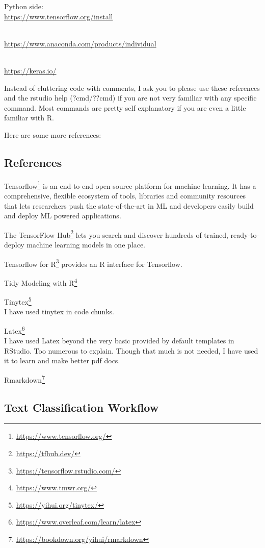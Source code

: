 \documentclass[
]{article}
\DeclareRobustCommand{\href}[2]{#2\footnote{\url{#1}}}
\begin{document}
Python side:\\
\url{https://www.tensorflow.org/install}\strut \\
\url{https://www.anaconda.com/products/individual}\strut \\
\url{https://keras.io/}

Instead of cluttering code with comments, I ask you to please use these
references and the rstudio help (?cmd/??cmd) if you are not very
familiar with any specific command. Most commands are pretty self
explanatory if you are even a little familiar with R.

Here are some more references:

\hypertarget{references}{%
\subsection{References}\label{references}}

\href{https://www.tensorflow.org/}{Tensorflow} is an end-to-end open
source platform for machine learning. It has a comprehensive, flexible
ecosystem of tools, libraries and community resources that lets
researchers push the state-of-the-art in ML and developers easily build
and deploy ML powered applications.

The \href{https://tfhub.dev/}{TensorFlow Hub} lets you search and
discover hundreds of trained, ready-to-deploy machine learning models in
one place.

\href{https://tensorflow.rstudio.com/}{Tensorflow for R} provides an R
interface for Tensorflow.

\href{https://www.tmwr.org/}{Tidy Modeling with R}

\href{https://yihui.org/tinytex/}{Tinytex}\\
I have used tinytex in code chunks.

\href{https://www.overleaf.com/learn/latex}{Latex}\\
I have used Latex beyond the very basic provided by default templates in
RStudio. Too numerous to explain. Though that much is not needed, I have
used it to learn and make better pdf docs.

\href{https://bookdown.org/yihui/rmarkdown}{Rmarkdown}

\newpage

\hypertarget{text-classification-workflow}{%
\subsection{Text Classification
Workflow}\label{text-classification-workflow}}
\end{document}
